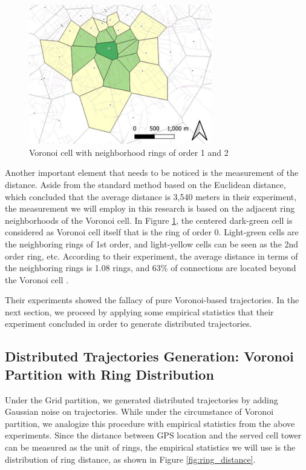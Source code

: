 \documentclass[12pt]{article}
\theoremstyle{definition}
\begin{document}
\begin{figure}
  \centering
  \includegraphics[width=8cm]{voronoi_ring.jpg}
  \caption{Voronoi cell with neighborhood rings of order 1 and 2 \cite{closest_antenna_fallacy_2021}}
  \label{fig:voronoi_ring}
\end{figure}

Another important element that needs to be noticed is the measurement of the distance. Aside from the standard method based on the Euclidean distance, which concluded that the average distance is 3,540 meters in their experiment, the measurement we will employ in this research is based on the adjacent ring neighborhoods of the Voronoi cell. In Figure \ref{fig:voronoi_ring}, the centered dark-green cell is considered as Voronoi cell itself that is the ring of order 0. Light-green cells are the neighboring rings of 1st order, and light-yellow cells can be seen as the 2nd order ring, etc. According to their experiment, the average distance in terms of the neighboring rings is 1.08 rings, and 63\% of connections are located beyond the Voronoi cell \cite{closest_antenna_fallacy_2021}. 



Their experiments showed the fallacy of pure Voronoi-based trajectories. In the next section, we proceed by applying some empirical statistics that their experiment concluded in order to generate distributed trajectories.



\subsection{Distributed Trajectories Generation: Voronoi Partition with Ring Distribution}
\label{sec:tm_voronoi_ring}
Under the Grid partition, we generated distributed trajectories by adding Gaussian noise on trajectories. While under the circumstance of Voronoi partition, we analogize this procedure with empirical statistics from the above experiments. Since the distance between GPS location and the served cell tower can be measured as the unit of rings, the empirical statistics we will use is the distribution of ring distance, as shown in Figure \ref{fig:ring_distance}.
\end{document}
